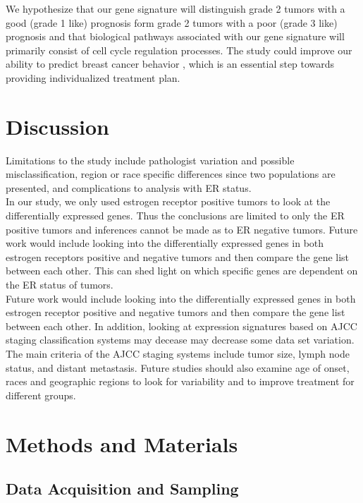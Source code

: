 \documentclass[a4paper,10pt]{article}
\begin{document}
We hypothesize that our gene signature will distinguish grade 2 tumors with a good (grade 1 like) 
prognosis form grade 2 tumors with a poor (grade 3 like) prognosis and that biological pathways 
associated with our gene signature will primarily consist of cell cycle regulation processes.  
The study could improve our ability to predict breast cancer behavior , which is an essential step towards providing 
individualized treatment  plan.\\
\section{Discussion}
Limitations to the study include pathologist variation and possible misclassification, region or 
race specific differences since two populations are presented, and complications to analysis with ER status. \\

In our study, we only used estrogen receptor positive tumors to look at the differentially 
expressed genes. Thus the conclusions are limited to only the ER positive tumors and 
inferences cannot be made as to ER negative tumors. Future work would include looking into the
 differentially expressed genes in both estrogen receptors positive and negative tumors and then
 compare the gene list between each other. This can shed light on which specific genes are dependent 
on the ER status of tumors. \\

Future work would include looking into the differentially expressed genes in both estrogen 
receptor positive and negative tumors and then compare the gene list between each other. 
In addition, looking at expression signatures based on AJCC staging classification systems 
may decease may decrease some data set variation. The main criteria of the AJCC staging 
systems include tumor size, lymph node status, and distant metastasis. Future studies should 
also examine age of onset, races and geographic regions to look for variability and to improve 
treatment for different groups.\\ 

\section{Methods and Materials}
\subsection{Data Acquisition and Sampling}
\end{document}
